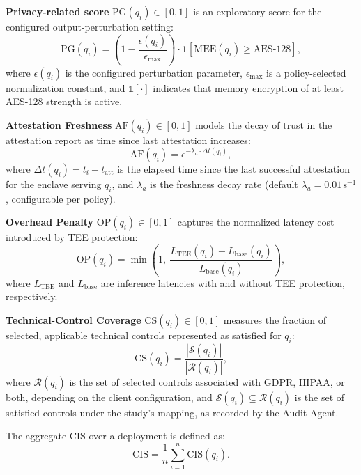\documentclass{ieeeaccess}
\begin{document}
\textbf{Privacy-related score} $\mathrm{PG}(q_i) \in [0,1]$ is an
exploratory score for the configured output-perturbation setting:
\begin{equation}
\label{eq:pg}
\mathrm{PG}(q_i) = \left(1 - \frac{\epsilon(q_i)}{\epsilon_{\max}}\right)
                   \cdot \mathbf{1}[\text{MEE}(q_i) \geq \text{AES-128}],
\end{equation}
where $\epsilon(q_i)$ is the configured perturbation parameter,
$\epsilon_{\max}$ is a policy-selected normalization constant, and
$\mathbb{1}[\cdot]$ indicates that memory encryption of at least
AES-128 strength is active.

\textbf{Attestation Freshness} $\mathrm{AF}(q_i) \in [0,1]$ models the
decay of trust in the attestation report as time since last attestation
increases:
\begin{equation}
\label{eq:af}
\mathrm{AF}(q_i) = e^{-\lambda_a \cdot \Delta t(q_i)},
\end{equation}
where $\Delta t(q_i) = t_i - t_{\text{att}}$ is the elapsed time since the
last successful attestation for the enclave serving $q_i$, and
$\lambda_a$ is the freshness decay rate (default $\lambda_a = 0.01\,\mathrm{s^{-1}}$, configurable per policy).

\textbf{Overhead Penalty} $\mathrm{OP}(q_i) \in [0,1]$ captures the
normalized latency cost introduced by TEE protection:
\begin{equation}
\label{eq:op}
\mathrm{OP}(q_i) = \min\!\left(1,\ \frac{L_{\mathrm{TEE}}(q_i) -
L_{\mathrm{base}}(q_i)}{L_{\mathrm{base}}(q_i)}\right),
\end{equation}
where $L_{\mathrm{TEE}}$ and $L_{\mathrm{base}}$ are inference latencies
with and without TEE protection, respectively.

\textbf{Technical-Control Coverage} $\mathrm{CS}(q_i) \in [0,1]$ measures the
fraction of selected, applicable technical controls represented as satisfied
for $q_i$:
\begin{equation}
\label{eq:cs}
\mathrm{CS}(q_i) = \frac{|\mathcal{S}(q_i)|}{|\mathcal{R}(q_i)|},
\end{equation}
where $\mathcal{R}(q_i)$ is the set of selected controls associated with
GDPR, HIPAA, or both, depending on the client configuration, and
$\mathcal{S}(q_i) \subseteq \mathcal{R}(q_i)$ is the set of satisfied
controls under the study's mapping, as recorded by the Audit Agent.

The aggregate CIS over a deployment is defined as:
\begin{equation}
\label{eq:cis-agg}
\overline{\mathrm{CIS}} = \frac{1}{n} \sum_{i=1}^{n} \mathrm{CIS}(q_i).
\end{equation}
\end{document}
